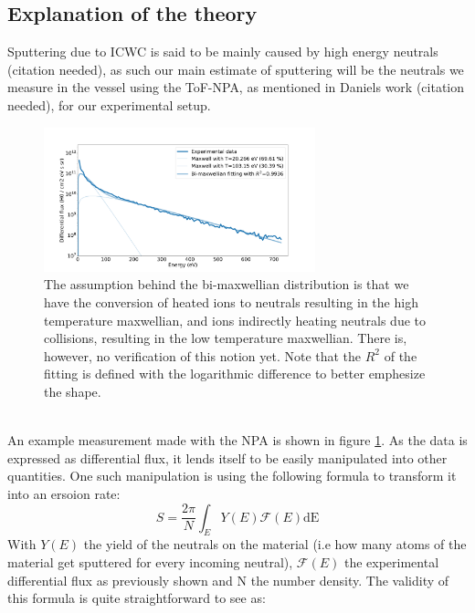 \documentclass{article}
\begin{document}
\subsection{Explanation of the theory}
Sputtering due to ICWC is said to be mainly caused by high energy neutrals (citation needed), as such 
our main estimate of sputtering will be the neutrals we measure in the vessel
using the ToF-NPA, as mentioned in Daniels work (citation needed), for our experimental setup.
\noindent
\begin{figure}[ht]
    \centering
    \includegraphics[width=0.7\textwidth]{figures/NPA_example.pdf}
    \caption{The assumption behind the bi-maxwellian distribution is that we have
    the conversion of heated ions to neutrals resulting in the high temperature
    maxwellian, and ions indirectly heating neutrals due to collisions, resulting
    in the low temperature maxwellian. There is, however, no verification of this
    notion yet. Note that the $R^2$ of the fitting is
    defined with the logarithmic difference to better emphesize the shape.}
    \label{fig:examplemeasurement}
\end{figure}\\
An example measurement made with the NPA is shown in figure
\ref{fig:examplemeasurement}. As the data is expressed as differential flux,
it lends itself to be easily manipulated into other quantities. One such manipulation
is using the following formula to transform it into an ersoion rate:
\begin{equation}
    S = \frac{2\pi}{N} \int_E Y(E)\mathcal{F} (E) \text{dE}
    \label{eqn:ErosionRateFormal}
\end{equation}
With $Y(E)$ the yield of the neutrals on the material (i.e how many atoms of
the material get sputtered for every incoming neutral), $\mathcal{F}(E)$ the
experimental differential flux as previously shown and N the number density.
The validity of this formula is quite straightforward to see as:
\end{document}
